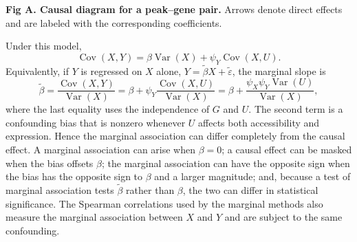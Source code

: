 \begin{center}
\vspace{6pt}

\begin{minipage}{0.85\linewidth}
\small\textbf{Fig A. Causal diagram for a peak--gene pair.} Arrows denote direct effects and are labeled with the corresponding coefficients.
\end{minipage}
\vspace{6pt}
\end{center}

\noindent Under this model,
\begin{equation*}
\operatorname{Cov}(X,Y)=\beta\operatorname{Var}(X)+\psi_Y\operatorname{Cov}(X,U).
\end{equation*}
Equivalently, if $Y$ is regressed on $X$ alone, $Y=\tilde{\beta}X+\tilde{\varepsilon}$, the marginal slope is
\begin{equation*}
\tilde{\beta}=\frac{\operatorname{Cov}(X,Y)}{\operatorname{Var}(X)}
=\beta+\psi_Y\frac{\operatorname{Cov}(X,U)}{\operatorname{Var}(X)}
=\beta+\frac{\psi_X\psi_Y\operatorname{Var}(U)}{\operatorname{Var}(X)},
\end{equation*}
where the last equality uses the independence of $G$ and $U$. The second term is a confounding bias that is nonzero whenever $U$ affects both accessibility and expression. Hence the marginal association can differ completely from the causal effect. A marginal association can arise when $\beta=0$; a causal effect can be masked when the bias offsets $\beta$; the marginal association can have the opposite sign when the bias has the opposite sign to $\beta$ and a larger magnitude; and, because a test of marginal association tests $\tilde{\beta}$ rather than $\beta$, the two can differ in statistical significance. The Spearman correlations used by the marginal methods also measure the marginal association between $X$ and $Y$ and are subject to the same confounding.


